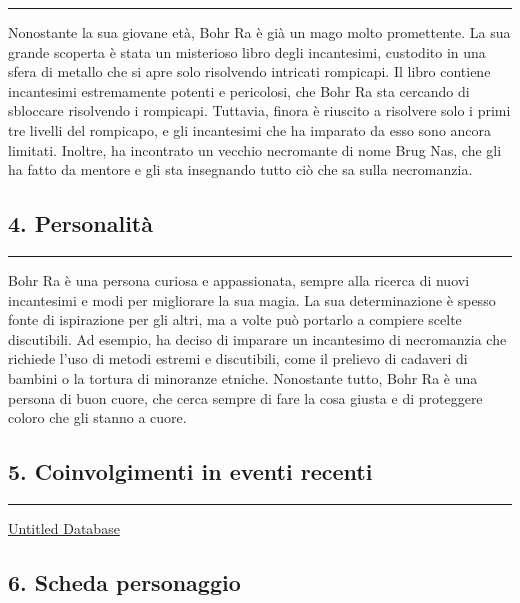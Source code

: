 \begin{center}\rule{0.5\linewidth}{0.5pt}\end{center}

Nonostante la sua giovane età, Bohr Ra è già un mago molto promettente.
La sua grande scoperta è stata un misterioso libro degli incantesimi,
custodito in una sfera di metallo che si apre solo risolvendo intricati
rompicapi. Il libro contiene incantesimi estremamente potenti e
pericolosi, che Bohr Ra sta cercando di sbloccare risolvendo i
rompicapi. Tuttavia, finora è riuscito a risolvere solo i primi tre
livelli del rompicapo, e gli incantesimi che ha imparato da esso sono
ancora limitati. Inoltre, ha incontrato un vecchio necromante di nome
Brug Nas, che gli ha fatto da mentore e gli sta insegnando tutto ciò che
sa sulla necromanzia.

\subsection{4. Personalità}\label{personalituxe0}

\begin{center}\rule{0.5\linewidth}{0.5pt}\end{center}

Bohr Ra è una persona curiosa e appassionata, sempre alla ricerca di
nuovi incantesimi e modi per migliorare la sua magia. La sua
determinazione è spesso fonte di ispirazione per gli altri, ma a volte
può portarlo a compiere scelte discutibili. Ad esempio, ha deciso di
imparare un incantesimo di necromanzia che richiede l'uso di metodi
estremi e discutibili, come il prelievo di cadaveri di bambini o la
tortura di minoranze etniche. Nonostante tutto, Bohr Ra è una persona di
buon cuore, che cerca sempre di fare la cosa giusta e di proteggere
coloro che gli stanno a cuore.

\subsection{5. Coinvolgimenti in eventi
recenti}\label{coinvolgimenti-in-eventi-recenti}

\begin{center}\rule{0.5\linewidth}{0.5pt}\end{center}

\href{Untitled\%20Database\%205dd9b35a85b54745899bb10bc75cb6bf.csv}{Untitled
Database}

\subsection{6. Scheda personaggio}\label{scheda-personaggio}

